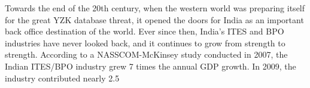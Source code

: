 Towards the end of the 20th century, when the western world was preparing itself for the great YZK database threat, it opened the doors for India as an important back office destination of the world. Ever since then, India's ITES and BPO industries  have never looked back, and it continues to grow from strength to strength. According to a NASSCOM-McKinsey study  conducted in 2007, the Indian ITES/BPO industry grew 7 times the annual GDP growth. In 2009, the industry contributed nearly 2.5%
